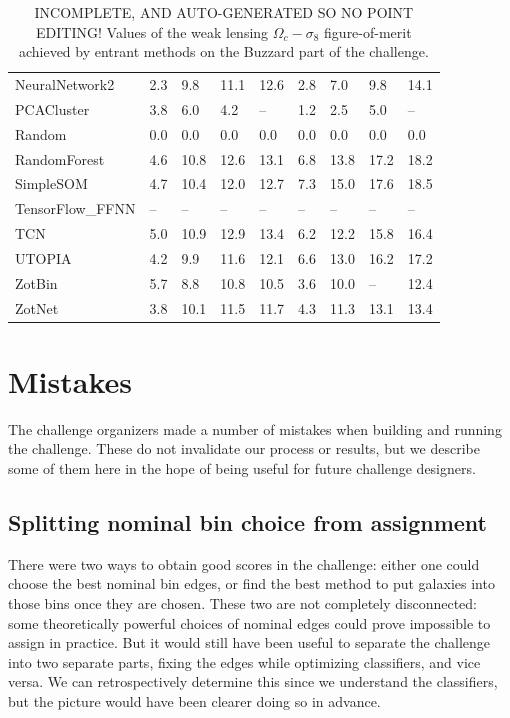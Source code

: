 \documentclass[twocolumn,twocolappendix]{aastex63}
\begin{document}
\begin{table}[]
\begin{tabular}{|l|llll|llll|}
{\sc NeuralNetwork2 } & 2.3 & 9.8    & 11.1    & 12.6    & 2.8             & 7.0             & 9.8             & 14.1\\
{\sc PCACluster } & 3.8 & 6.0    & 4.2    & --    & 1.2             & 2.5             & 5.0             & --\\
{\sc Random } & 0.0 & 0.0    & 0.0    & 0.0    & 0.0             & 0.0             & 0.0             & 0.0\\
{\sc RandomForest } & 4.6 & 10.8    & 12.6    & 13.1    & 6.8             & 13.8             & 17.2             & 18.2\\
{\sc SimpleSOM } & 4.7 & 10.4    & 12.0    & 12.7    & 7.3             & 15.0             & 17.6             & 18.5\\
{\sc TensorFlow\_FFNN } & -- & --    & --    & --    & --             & --             & --             & --\\
{\sc TCN } & 5.0 & 10.9    & 12.9    & 13.4    & 6.2             & 12.2             & 15.8             & 16.4\\
{\sc UTOPIA } & 4.2 & 9.9    & 11.6    & 12.1    & 6.6             & 13.0             & 16.2             & 17.2\\
{\sc ZotBin } & 5.7 & 8.8    & 10.8    & 10.5    & 3.6             & 10.0             & --             & 12.4\\
{\sc ZotNet } & 3.8 & 10.1    & 11.5    & 11.7    & 4.3             & 11.3             & 13.1             & 13.4\\
\end{tabular}
\caption{INCOMPLETE, AND AUTO-GENERATED SO NO POINT EDITING! Values of the weak lensing $\Omega_c - \sigma_8$
figure-of-merit achieved by entrant methods on the Buzzard part of the challenge.}
\label{tab:buzzard_wl}
\end{table}

\section{Mistakes}
The challenge organizers made a number of mistakes when building and running the challenge.
These do not invalidate our process or results, but we describe some of them here in the hope of
being useful for future challenge designers.

\subsection{Splitting nominal bin choice from assignment}
There were two ways to obtain good scores in the challenge: either one could choose the best
nominal bin edges, or find the best method to put galaxies into those bins once they are chosen.
These two are not completely disconnected: some theoretically powerful choices of nominal edges
could prove impossible to assign in practice.  But it would still have been useful to separate
the challenge into two separate parts, fixing the edges while optimizing classifiers, and vice
versa.   We can retrospectively determine this since we understand the classifiers, but the picture
would have been clearer doing so in advance.
\end{document}
